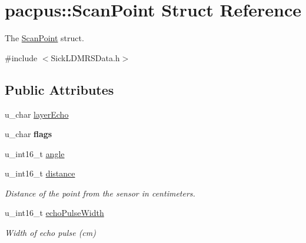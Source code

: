\hypertarget{structpacpus_1_1ScanPoint}{\section{pacpus\-:\-:Scan\-Point Struct Reference}
\label{structpacpus_1_1ScanPoint}
}


The \hyperlink{structpacpus_1_1ScanPoint}{Scan\-Point} struct.  




{\ttfamily \#include $<$Sick\-L\-D\-M\-R\-S\-Data.\-h$>$}

\subsection*{Public Attributes}
\begin{DoxyCompactItemize}
\item 
u\-\_\-char \hyperlink{structpacpus_1_1ScanPoint_a300ce0213fd1a9ea59687f29b68046bc}{layer\-Echo}
\item 
\hypertarget{structpacpus_1_1ScanPoint_a6a3519e30743dee6230e7167f4c250f3}{u\-\_\-char {\bfseries flags}}\label{structpacpus_1_1ScanPoint_a6a3519e30743dee6230e7167f4c250f3}

\item 
u\-\_\-int16\-\_\-t \hyperlink{structpacpus_1_1ScanPoint_af551038f4f967b5289f50c9454bc8619}{angle}
\item 
\hypertarget{structpacpus_1_1ScanPoint_a74e9ebbf0df0e334e74788ce34410f80}{u\-\_\-int16\-\_\-t \hyperlink{structpacpus_1_1ScanPoint_a74e9ebbf0df0e334e74788ce34410f80}{distance}}\label{structpacpus_1_1ScanPoint_a74e9ebbf0df0e334e74788ce34410f80}

\begin{DoxyCompactList}\small\item\em Distance of the point from the sensor in centimeters. \end{DoxyCompactList}\item 
\hypertarget{structpacpus_1_1ScanPoint_a8c32bbdc82afbd32100ceb959eb645d7}{u\-\_\-int16\-\_\-t \hyperlink{structpacpus_1_1ScanPoint_a8c32bbdc82afbd32100ceb959eb645d7}{echo\-Pulse\-Width}}\label{structpacpus_1_1ScanPoint_a8c32bbdc82afbd32100ceb959eb645d7}

\begin{DoxyCompactList}\small\item\em Width of echo pulse (cm) \end{DoxyCompactList}\end{DoxyCompactItemize}


